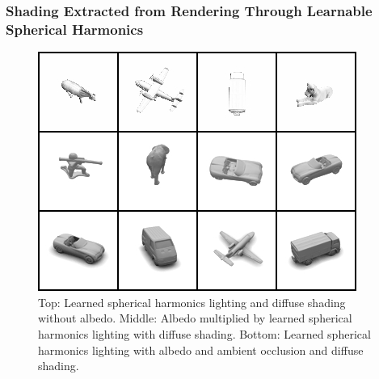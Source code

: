 \documentclass[10pt,twocolumn,letterpaper]{article}
\begin{document}
\subsubsection{Shading Extracted from Rendering Through Learnable Spherical Harmonics}\label{sec:learned_sh}
\begin{figure}[h!]
\centering
\includegraphics[width=1.0\columnwidth]{./assets/SHComparisons.png}
\caption{Top: Learned spherical harmonics lighting and diffuse shading without albedo. Middle: Albedo multiplied by learned spherical harmonics lighting with diffuse shading. Bottom: Learned spherical harmonics lighting with albedo and ambient occlusion and diffuse shading.}
\label{fig:SHComparison}
\end{figure}
\end{document}
